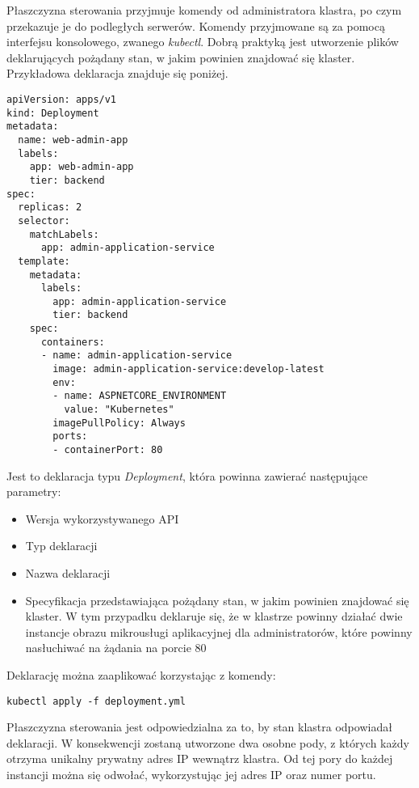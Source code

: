 Płaszczyzna sterowania przyjmuje komendy od administratora klastra, po czym przekazuje 
je do podległych serwerów. Komendy przyjmowane są za pomocą interfejsu 
konsolowego, zwanego \textit{kubectl}. Dobrą praktyką jest utworzenie plików deklarujących 
pożądany stan, w jakim powinien znajdować się klaster. Przykładowa deklaracja znajduje 
się poniżej.

\begin{lstlisting}
apiVersion: apps/v1
kind: Deployment
metadata:
  name: web-admin-app
  labels:
    app: web-admin-app
    tier: backend
spec:
  replicas: 2
  selector:
    matchLabels:
      app: admin-application-service
  template:
    metadata:
      labels:
        app: admin-application-service
        tier: backend
    spec:
      containers:
      - name: admin-application-service
        image: admin-application-service:develop-latest
        env:
        - name: ASPNETCORE_ENVIRONMENT
          value: "Kubernetes"
        imagePullPolicy: Always
        ports:
        - containerPort: 80
\end{lstlisting}

Jest to deklaracja typu \textit{Deployment}, która powinna zawierać następujące parametry:

\begin{itemize} %
    \item Wersja wykorzystywanego API
    \item Typ deklaracji
    \item Nazwa deklaracji
    \item Specyfikacja przedstawiająca pożądany stan, w jakim powinien znajdować się 
    klaster. W tym przypadku deklaruje się, że w klastrze powinny działać dwie 
    instancje obrazu mikrousługi aplikacyjnej dla administratorów, które powinny 
    nasłuchiwać na żądania na porcie 80
\end{itemize}

Deklarację można zaaplikować korzystając z komendy:

\begin{lstlisting}
kubectl apply -f deployment.yml
\end{lstlisting}

Płaszczyzna sterowania jest odpowiedzialna za to, by stan klastra odpowiadał 
deklaracji. W konsekwencji zostaną utworzone dwa osobne pody, z których każdy otrzyma 
unikalny prywatny adres IP wewnątrz klastra. Od tej pory do każdej instancji można 
się odwołać, wykorzystując jej adres IP oraz numer portu.

